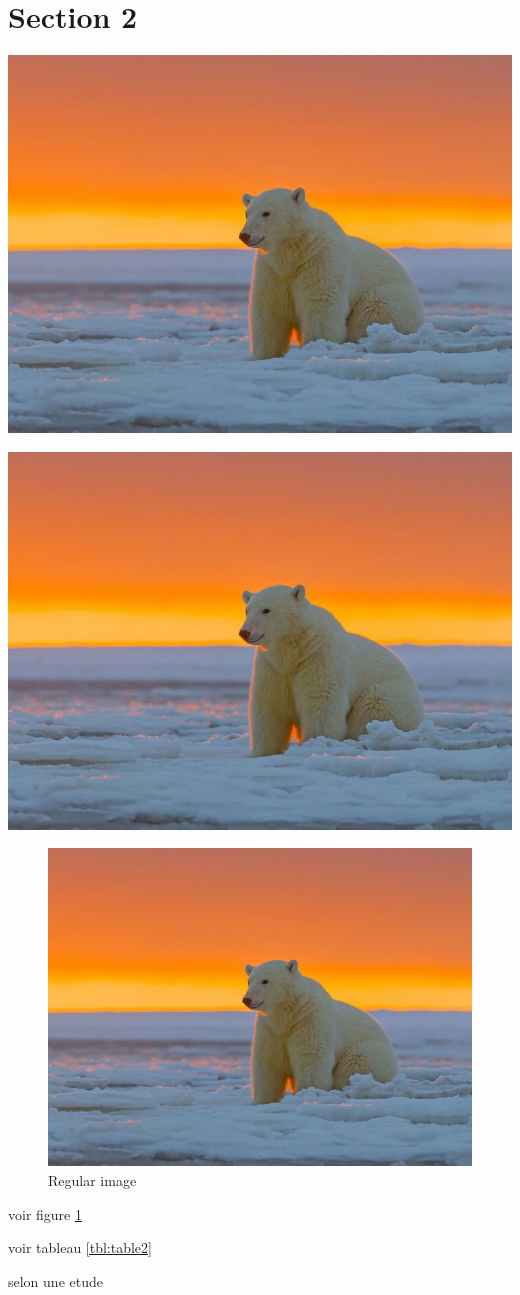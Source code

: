 \documentclass[14pt]{extarticle}
\let\cite\parencite
\begin{document}
\section{Section 2}
\label{sec:orge159329}
\begin{minipage}{.5\textwidth}
\begin{center}
\includegraphics[width=.8\linewidth]{./img/bear.jpg}
\end{center}
\vspace*{-5mm}
\label{fig:figure1}
\end{minipage}
\begin{minipage}{.5\textwidth}
\begin{center}
\includegraphics[width=.8\linewidth]{./img/bear.jpg}
\end{center}
\vspace*{-5mm}
\label{fig:figure2}
\end{minipage}

\begin{figure}[htbp]
\centering
\includegraphics[width=.4\linewidth]{./img/bear.jpg}
\caption{\label{fig:figure3}Regular image}
\end{figure}

\newpage
voir figure \ref{fig:figure3}

voir tableau \ref{tbl:table2}


selon une etude \cite{2021}

\newpage

{}

\printbibliography
\end{document}

